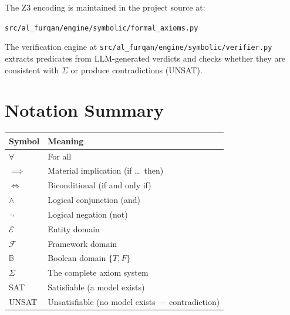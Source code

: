 \documentclass[11pt,a4paper]{article}
\theoremstyle{definition}
\newcommand{\E}{\mathcal{E}}      %
\newcommand{\F}{\mathcal{F}}      %
\begin{document}
\medskip\noindent
The Z3 encoding is maintained in the project source at:

\texttt{src/al\_furqan/engine/symbolic/formal\_axioms.py}

\medskip\noindent
The verification engine at
\texttt{src/al\_furqan/engine/symbolic/verifier.py}
extracts predicates from LLM-generated verdicts and checks whether they are
consistent with $\Sigma$ or produce contradictions (UNSAT).

\section{Notation Summary}

\begin{center}
\begin{tabular}{@{} l l @{}}
\toprule
\textbf{Symbol} & \textbf{Meaning} \\
\midrule
$\forall$         & For all \\
$\implies$        & Material implication (if \ldots\ then) \\
$\iff$            & Biconditional (if and only if) \\
$\land$           & Logical conjunction (and) \\
$\lnot$           & Logical negation (not) \\
$\E$              & Entity domain \\
$\F$              & Framework domain \\
$\mathbb{B}$      & Boolean domain $\{T, F\}$ \\
$\Sigma$          & The complete axiom system \\
SAT               & Satisfiable (a model exists) \\
UNSAT             & Unsatisfiable (no model exists --- contradiction) \\
\bottomrule
\end{tabular}
\end{center}
\end{document}
